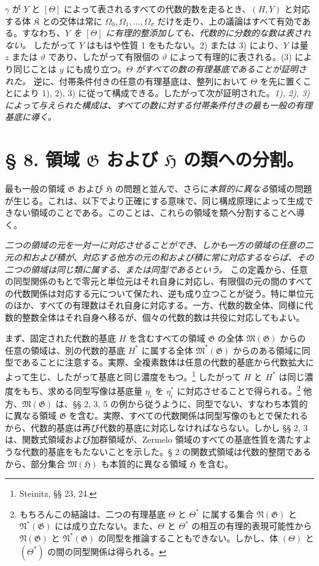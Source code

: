 \documentclass[11pt]{article}
\begin{document}
$\gamma$ が $Y$ と $[\Theta]$ によって表されるすべての代数的数を走るとき、$(H,Y)$ と対応する体 $\mathfrak K$ との交体は常に $\Omega_0,\Omega_1,\ldots,\Omega_\sigma$ だけを走り、上の議論はすべて有効である。すなわち、\emph{$Y$ を $[\Theta]$ に有理的整添加しても、代数的に分数的な数は表されない。} したがって $Y$ はもはや性質 1 をもたない。2) または 3) により、$Y$ は量 $z$ または $\vartheta$ であり、したがって有限個の $\vartheta$ によって有理的に表される。(3) により同じことは $y$ にも成り立つ。\emph{$\Theta$ がすべての数の有理基底であることが証明された。} 逆に、付帯条件付きの任意の有理基底は、整列において $\Theta$ を先に置くことにより 1), 2), 3) に従って構成できる。したがって次が証明された。\emph{1), 2), 3) によって与えられた構成は、すべての数に対する付帯条件付きの最も一般の有理基底に導く。}

\section*{§ 8. 領域 $\mathfrak G$ および $\mathfrak H$ の類への分割。}

最も一般の領域 $\mathfrak G$ および $\mathfrak H$ の問題と並んで、さらに\emph{本質的に異なる}領域の問題が生じる。これは、以下でより正確にする意味で、同じ構成原理によって生成できない領域のことである。このことは、これらの領域を類へ分割することへ導く。

\emph{二つの領域の元を一対一に対応させることができ、しかも一方の領域の任意の二元の和および積が、対応する他方の元の和および積に常に対応するならば、その二つの領域は同じ類に属する、または同型であるという。} この定義から、任意の同型関係のもとで零元と単位元はそれ自身に対応し、有限個の元の間のすべての代数関係は対応する元について保たれ、逆も成り立つことが従う。特に単位元のほか、すべての有理数はそれ自身に対応する。一方、代数的数全体、同様に代数的整数全体はそれ自身へ移るが、個々の代数的数は共役に対応してもよい。

まず、固定された代数的基底 $H$ を含むすべての領域 $\mathfrak G$ の全体 $\mathfrak M(\mathfrak G)$ からの任意の領域は、別の代数的基底 $H^*$ に属する全体 $\mathfrak M^*(\mathfrak G)$ からのある領域に同型であることに注意する。実際、全複素数体は任意の代数的基底から代数拡大によって生じ、したがって基底と同じ濃度をもつ。\footnote{Steinitz, §§ 23, 24.} したがって $H$ と $H^*$ は同じ濃度をもち、求める同型写像は基底量 $\eta_i$ を $\eta_i^*$ に対応させることで得られる。\footnote{もちろんこの結論は、二つの有理基底 $\Theta$ と $\Theta^*$ に属する集合 $\mathfrak N(\mathfrak G)$ と $\mathfrak N^*(\mathfrak G)$ には成り立たない。また、$\Theta$ と $\Theta^*$ の相互の有理的表現可能性から $\mathfrak N(\mathfrak G)$ と $\mathfrak N^*(\mathfrak G)$ の同型を推論することもできない。しかし、体 $(\Theta)$ と $(\Theta^*)$ の間の同型関係は得られる。} 他方、$\mathfrak M(\mathfrak G)$ は、§§ 2, 3, 5 の例から従うように、同型でない、すなわち本質的に異なる領域 $\mathfrak G$ を含む。実際、すべての代数関係は同型写像のもとで保たれるから、代数的基底は再び代数的基底に対応しなければならない。しかし §§ 2, 3 は、関数式領域および加群領域が、Zermelo 領域のすべての基底性質を満たすような代数的基底をもたないことを示した。§ 2 の関数式領域は代数的整閉であるから、部分集合 $\mathfrak M(\mathfrak H)$ も本質的に異なる領域 $\mathfrak H$ を含む。
\end{document}
